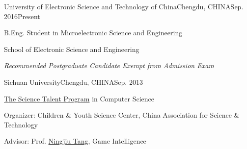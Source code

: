 
\begin{eduitem}{University of Electronic Science and Technology of China}{Chengdu, CHINA}{Sep. 2016}{Present}
\item B.Eng. Student in Microelectronic Science and Engineering
\item School of Electronic Science and Engineering
\item {\emph{Recommended Postgraduate Candidate Exempt from Admission Exam}}
\end{eduitem}

\begin{eduitem}{Sichuan University}{Chengdu, CHINA}{Sep. 2013}{}%
\item \href{http://ycjh.org}{The Science Talent Program} in Computer Science 
\item Organizer: Children \& Youth Science Center, China Association for Science \& Technology
\item Advisor: Prof. \href{http://cs.scu.edu.cn/info/1074/3930.htm}{Ningjiu Tang}, Game Intelligence
\end{eduitem}


\endinput